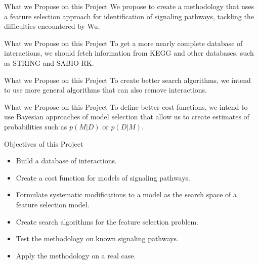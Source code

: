 \documentclass{beamer}
\begin{document}

\begin{frame}{What we Propose on this Project}
We propose to create a methodology that uses a feature selection 
approach for identification of signaling pathways, tackling the 
difficulties encountered by Wu.
\end{frame}


\begin{frame}{What we Propose on this Project}
To get a more nearly complete database of interactions, we should fetch 
information from KEGG and other databases, \pause such as STRING and
SABIO-RK.
\end{frame}


\begin{frame}{What we Propose on this Project}
To create better search algorithms, \pause we intend to use more general
algorithms that can also remove interactions.
\end{frame}


\begin{frame}{What we Propose on this Project}
To define better cost functions, \pause we intend to use Bayesian 
approaches of model selection that allow us to create estimates of 
probabilities such as $p (M | D)$ or $p (D | M)$.
\end{frame}


\begin{frame}{Objectives of this Project}
\begin{itemize}
\pause
\item{Build a database of interactions.}
\pause
\item{Create a cost function for models of signaling pathways.}
\pause
\item{Formulate systematic modifications to a model as the search space
    of a feature selection model.}
\pause
\item{Create search algorithms for the feature selection problem.}
\pause
\item{Test the methodology on known signaling pathways.}
\pause
\item{Apply the methodology on a real case.}
\end{itemize}
\end{frame}


\end{document}
